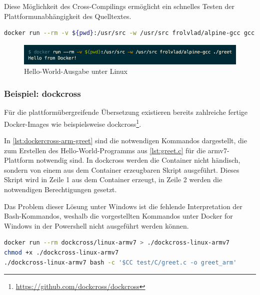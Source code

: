 Diese Möglichkeit des Cross-Compilings ermöglicht ein schnelles Testen der Plattformunabhängigkeit des Quelltextes.



\begin{lstlisting}[caption=Docker-Kommando zum Übersetzen eines C-Programmes mit gcc, language=bash, label=lst:docker-run-gcc]
docker run --rm -v ${pwd}:/usr/src -w /usr/src frolvlad/alpine-gcc gcc -o greet greet.c
\end{lstlisting}

\begin{figure}[htbp]
    \centering
    \includegraphics[width=0.8\linewidth,clip]{images/greet-output}
    \caption{Hello-World-Ausgabe unter Linux}
\label{fig:greet-output}
\end{figure}

\subsubsection{Beispiel: dockcross}
Für die plattformübergreifende Übersetzung existieren bereits zahlreiche fertige Docker-Images wie beispielsweise dockcross\footnote{\url{https://github.com/dockcross/dockcross}}.

In \cref{lst:dockercross-arm-greet} sind die notwendigen Kommandos dargestellt, die zum Erstellen des Hello-World-Programms aus \cref{lst:greet.c} für die armv7-Plattform notwendig sind.
In dockcross werden die Container nicht händisch, sondern von einem aus dem Container erzeugbaren Skript ausgeführt.
Dieses Skript wird in Zeile 1 aus dem Container erzeugt, in Zeile 2 werden die notwendigen Berechtigungen gesetzt.

Das Problem dieser Lösung unter Windows ist die fehlende Interpretation der Bash-Kommandos, weshalb die vorgestellten Kommandos unter Docker for Windows in der Powershell nicht ausgeführt werden können.

\begin{lstlisting}[caption=Kommandos zum Kompilieren mit dockcross, language=bash, label=lst:dockercross-arm-greet]
docker run --rm dockcross/linux-armv7 > ./dockcross-linux-armv7
chmod +x ./dockcross-linux-armv7
./dockcross-linux-armv7 bash -c '$CC test/C/greet.c -o greet_arm'
\end{lstlisting}

